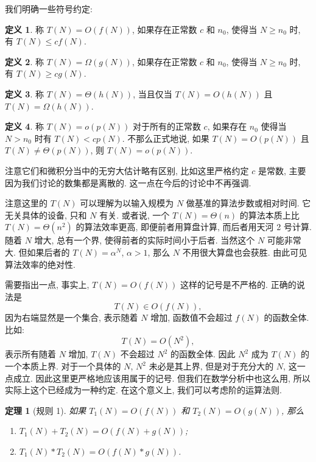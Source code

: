 \documentclass[a4paper]{ctexart}
\newtheorem{theorem}{定理}
\theoremstyle{definition}
\newtheorem{definition}{定义}[section]
\theoremstyle{definition}
\begin{document}
我们明确一些符号约定:

\begin{definition}
  称 $T(N) = O(f(N))$, 如果存在正常数 $c$ 和 $n_0$,
  使得当 $N \geq n_0$ 时, 有 $T(N) \leq cf(N)$.
\end{definition}

\begin{definition}
  称 $T(N) = \Omega(g(N))$, 如果存在正常数 $c$ 和 $n_0$,
  使得当 $N \geq n_0$ 时, 有 $T(N) \geq cg(N)$.  
\end{definition}

\begin{definition}
称 $T(N) = \Theta(h(N))$, 当且仅当 $T(N) = O(h(N))$ 且 $T(N) = \Omega(h(N))$.  
\end{definition}

\begin{definition}
  称 $T(N) = o(p(N))$ 对于所有的正常数 $c$,
  如果存在 $n_0$ 使得当 $N > n_0$ 时有 $T(N) < cp(N)$.
  不那么正式地说, 如果 $T(N) = O(p(N))$ 且 $T(N) \neq \Theta(p(N))$,
  则 $T(N) = o(p(N))$.
\end{definition}

注意它们和微积分当中的无穷大估计略有区别, 比如这里严格约定 $c$ 是常数,
主要因为我们讨论的数集都是离散的. 这一点在今后的讨论中不再强调.

注意这里的 $T(N)$ 可以理解为以输入规模为 $N$ 做基准的算法步数或相对时间.
它无关具体的设备, 只和 $N$ 有关. 或者说,
一个 $T(N) = \Theta(n)$ 的算法本质上比 $T(N) = \Theta(n^2)$ 的算法效率更高,
即便前者用算盘计算, 而后者用天河 2 号计算. 随着 $N$ 增大, 总有一个界,
使得前者的实际时间小于后者. 当然这个 $N$ 可能非常大. 但如果后者的
$T(N) = \alpha^N$, $\alpha > 1$, 那么 $N$ 不用很大算盘也会获胜.
由此可见算法效率的绝对性.

需要指出一点, 事实上, $T(N) = O(f(N))$ 这样的记号是不严格的.
正确的说法是
$$
T(N) \in O(f(N)),
$$
因为右端显然是一个集合, 表示随着 $N$ 增加, 函数值不会超过 $f(N)$ 的函数全体.
比如:
$$
T(N) = O(N^2),
$$
表示所有随着 $N$ 增加, $T(N)$ 不会超过 $N^2$ 的函数全体.
因此 $N^2$ 成为 $T(N)$ 的一个本质上界. 对于一个具体的 $N$,
$N^2$ 未必是其上界, 但是对于充分大的 $N$, 这一点成立.
因此这里更严格地应该用属于的记号. 但我们在数学分析中也这么用,
所以实际上这个已经成为一种约定.
在这个意义上, 我们可以考虑阶的运算法则.

\begin{theorem}[规则 1]
  如果 $T_1(N) = O(f(N))$ 和 $T_2(N) = O(g(N))$, 那么
\begin{enumerate}
\item $T_1(N) + T_2(N) = O(f(N) + g(N))$;
\item $T_1(N) * T_2(N) = O(f(N) * g(N))$.
\end{enumerate}
\end{theorem}
\end{document}

